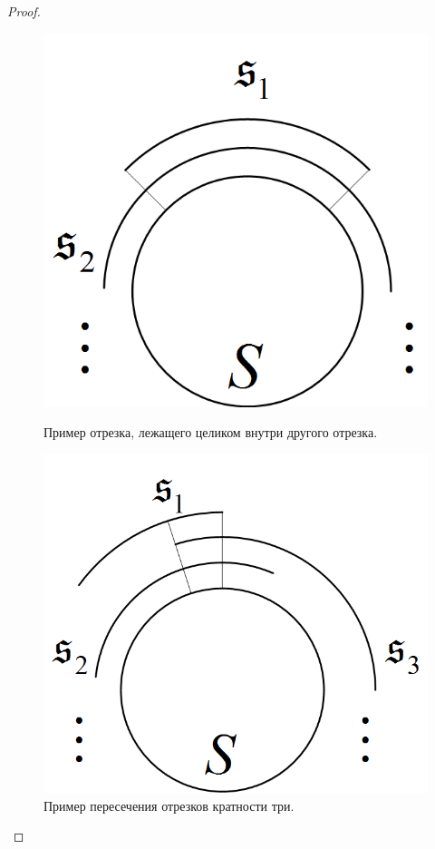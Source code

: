 \begin{proof}
\begin{figure}[htb!]
\centering
\begin{minipage}[t]{0.4\textwidth}
\centering
\includegraphics[scale=1.0]{images/two_segment.png}
\caption{Пример отрезка, лежащего целиком внутри другого отрезка.}
\label{fig:two_segments}
\end{minipage}
\hspace{0.5cm}
\begin{minipage}[t]{0.4\textwidth}
\centering
\includegraphics[scale=1.0]{images/three_segment.png}
\caption{Пример пересечения отрезков кратности три.}
\label{fig:three_segments}
\end{minipage}
\end{figure}


\end{proof}
